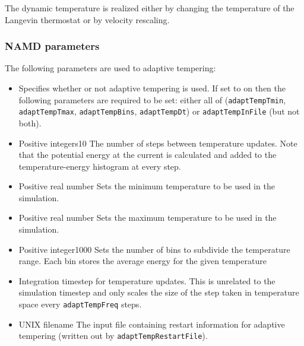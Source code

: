 The dynamic temperature is realized either by changing the temperature of the Langevin thermostat or by velocity rescaling. 

\subsubsection{NAMD parameters}

The following parameters are used to adaptive tempering:

\begin{itemize}

\item
{}
{Specifies whether or not adaptive tempering is used. If set to on then the following parameters are required to be set: either all of ({\tt adaptTempTmin}, {\tt adaptTempTmax}, {\tt adaptTempBins}, {\tt adaptTempDt}) or {\tt adaptTempInFile} (but not both).
}

\item
{}
{Positive integers}{10}
{The number of steps between temperature updates. Note that the potential energy at the current is calculated and added to the temperature-energy histogram at every step.
}

\item
{}
{Positive real number} 
{Sets the minimum temperature to be used in the simulation.
}

\item
{}
{Positive real number}
{Sets the maximum temperature to be used in the simulation.
}

\item
{}
{Positive integer}{1000}
{Sets the number of bins to subdivide the temperature range. Each bin stores the average energy for the given temperature 
}

\item
{}
{Integration timestep for temperature updates. This is unrelated to the simulation timestep and only scales the size of the step taken in temperature space every {\tt adaptTempFreq} steps.
}

\item
{}
{UNIX filename}
{The input file containing restart information for adaptive tempering (written out by {\tt adaptTempRestartFile}).
}


\end{itemize}
